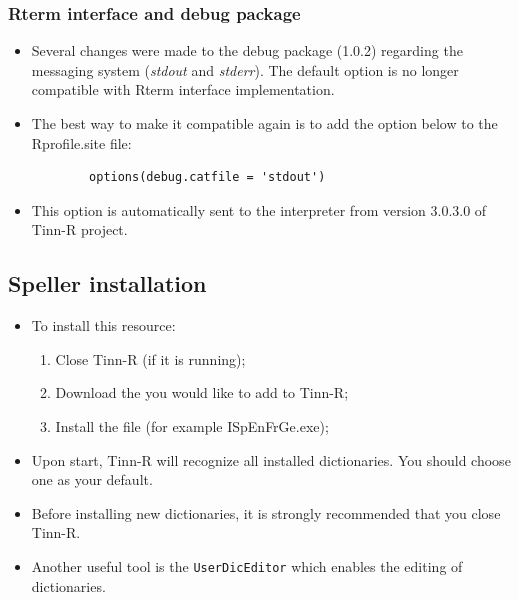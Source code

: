 \newpage
\subsubsection{Rterm interface and debug package}

\begin{itemize}
  \item Several changes were made to the debug package (1.0.2) regarding
    the messaging system (\textit{stdout} and \textit{stderr}). The
    default option is no longer compatible with Rterm interface
    implementation.
  \item The best way to make it compatible again is to add the option
    below to the Rprofile.site file:

    \begin{footnotesize}
      \begin{verbatim}
        options(debug.catfile = 'stdout')
      \end{verbatim}
    \end{footnotesize}

   \item This option is automatically sent to the \RR{} interpreter from version 3.0.3.0 of Tinn-R project.
\end{itemize}


\hypertarget{configuration_spellerinstalation}{}
\subsection{Speller installation}

\begin{itemize}
  \item To install this resource:
    \begin{enumerate}
      \item Close Tinn-R (if it is running);
      \item Download the
        you would like to add to Tinn-R;
      \item Install the file (for example ISpEnFrGe.exe);
    \end{enumerate}
  \item Upon start, Tinn-R will recognize all installed dictionaries.
    You should choose one as your default.
  \item Before installing new dictionaries, it is strongly
    recommended that you close Tinn-R.
  \item Another useful tool is the \texttt{UserDicEditor} which
    enables the editing of dictionaries.
\end{itemize}


